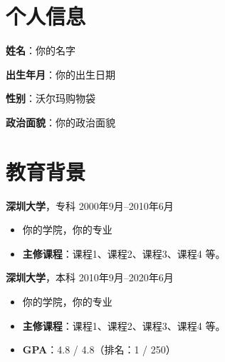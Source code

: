 \documentclass[11pt]{article}
\newlength{\iconwidth}
\begin{document}
    \begin{minipage}[t]{0.78\textwidth}
        \begin{minipage}[t]{\textwidth}
        \section[个人信息]{\makebox[\iconwidth][c]{\color{primary_color}{\Large $\bullet$}}\quad 个人信息}
        \begin{minipage}[t]{0.5\textwidth}
            \textbf{姓\qquad 名}：你的名字
            
            \vspace{0.5em}
            \textbf{出生年月}：你的出生日期
        \end{minipage}
        \begin{minipage}[t]{0.35\textwidth}
            \textbf{性\qquad 别}：沃尔玛购物袋
            
            \vspace{0.5em}
            \textbf{政治面貌}：你的政治面貌
        \end{minipage}
        \vspace{1.2em}
        \end{minipage}

        \begin{minipage}[t]{\textwidth}
        \section[教育背景]{\makebox[\iconwidth][c]{\color{primary_color}{\Large $\bullet$}}\quad 教育背景}
        
        {\large \textbf{深圳大学}}，专科 \hfill 2000年9月--2010年6月
        \begin{itemize}
            \item 你的学院，你的专业
            \item \textbf{主修课程}：课程1、课程2、课程3、课程4 等。
        \end{itemize}
        
        \vspace{0.5em}
        {\large \textbf{深圳大学}}，本科 \hfill 2010年9月--2020年6月
        \begin{itemize}
            \item 你的学院，你的专业
            \item \textbf{主修课程}：课程1、课程2、课程3、课程4 等。
            \item \textbf{GPA}：4.8 / 4.8（排名：1 / 250）
        \end{itemize}
        

\end{minipage}
\end{minipage}
\end{document}
